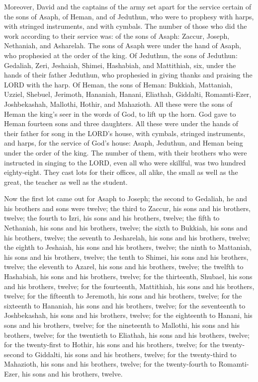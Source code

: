 \mychapter{} \myverse*{}Moreover, David and the captains of the army set apart for the
service certain of the sons of Asaph, of Heman, and of Jeduthun, who were to prophesy with harps, with
stringed instruments, and with cymbals. The number of those who did the work according to their service
was:
\myverse{}of the sons of Asaph: Zaccur, Joseph, Nethaniah, and Asharelah. The sons of
Asaph were under the hand of Asaph, who prophesied at the order of the king.
\myverse{}Of Jeduthun, the sons of Jeduthun: Gedaliah, Zeri, Jeshaiah, Shimei, Hashabiah,
and Mattithiah, six, under the hands of their father Jeduthun, who prophesied in giving thanks and praising
the LORD with the harp.
\myverse{}Of Heman, the sons of Heman: Bukkiah, Mattaniah, Uzziel, Shebuel, Jerimoth,
Hananiah, Hanani, Eliathah, Giddalti, Romamti-Ezer, Joshbekashah, Mallothi, Hothir, and Mahazioth.
\myverse{}All these were the sons of Heman the king’s seer in the words of God, to lift
up the horn. God gave to Heman fourteen sons and three daughters.
\myverse{}All these were under the hands of their father for song in the LORD’s house,
with cymbals, stringed instruments, and harps, for the service of God’s house: Asaph, Jeduthun, and Heman
being under the order of the king.
\myverse{}The number of them, with their brothers who were instructed in singing to the
LORD, even all who were skillful, was two hundred eighty-eight.
\myverse{}They cast lots for their offices, all alike, the small as well as the great,
the teacher as well as the student.

\myverse{}Now the first lot came out for Asaph to Joseph; the second to
Gedaliah, he and his brothers and sons were twelve;
\myverse{}the third to Zaccur, his sons and his brothers, twelve;
\myverse{}the fourth to Izri, his sons and his brothers, twelve;
\myverse{}the fifth to Nethaniah, his sons and his brothers, twelve;
\myverse{}the sixth to Bukkiah, his sons and his brothers, twelve;
\myverse{}the seventh to Jesharelah, his sons and his brothers, twelve;
\myverse{}the eighth to Jeshaiah, his sons and his brothers, twelve;
\myverse{}the ninth to Mattaniah, his sons and his brothers, twelve;
\myverse{}the tenth to Shimei, his sons and his brothers, twelve;
\myverse{}the eleventh to Azarel, his sons and his brothers, twelve;
\myverse{}the twelfth to Hashabiah, his sons and his brothers, twelve;
\myverse{}for the thirteenth, Shubael, his sons and his brothers, twelve;
\myverse{}for the fourteenth, Mattithiah, his sons and his brothers, twelve;
\myverse{}for the fifteenth to Jeremoth, his sons and his brothers, twelve;
\myverse{}for the sixteenth to Hananiah, his sons and his brothers, twelve;
\myverse{}for the seventeenth to Joshbekashah, his sons and his brothers, twelve;
\myverse{}for the eighteenth to Hanani, his sons and his brothers, twelve;
\myverse{}for the nineteenth to Mallothi, his sons and his brothers, twelve;
\myverse{}for the twentieth to Eliathah, his sons and his brothers, twelve;
\myverse{}for the twenty-first to Hothir, his sons and his brothers, twelve;
\myverse{}for the twenty-second to Giddalti, his sons and his brothers, twelve;
\myverse{}for the twenty-third to Mahazioth, his sons and his brothers, twelve;
\myverse{}for the twenty-fourth to Romamti-Ezer, his sons and his brothers, twelve.


